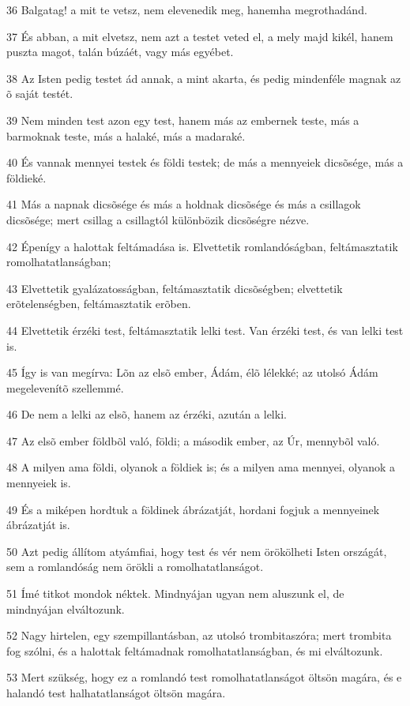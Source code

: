 \par 36 Balgatag! a mit te vetsz, nem elevenedik meg, hanemha megrothadánd.
\par 37 És abban, a mit elvetsz, nem azt a testet veted el, a mely majd kikél, hanem puszta magot, talán búzáét, vagy más egyébet.
\par 38 Az Isten pedig testet ád annak, a mint akarta, és pedig mindenféle magnak az õ saját testét.
\par 39 Nem minden test azon egy test, hanem más az embernek teste, más a barmoknak teste, más a halaké, más a madaraké.
\par 40 És vannak mennyei testek és földi testek; de más a mennyeiek dicsõsége, más a földieké.
\par 41 Más a napnak dicsõsége és más a holdnak dicsõsége és más a csillagok dicsõsége; mert csillag a csillagtól különbözik dicsõségre nézve.
\par 42 Épenígy a halottak feltámadása is. Elvettetik romlandóságban, feltámasztatik romolhatatlanságban;
\par 43 Elvettetik gyalázatosságban, feltámasztatik dicsõségben; elvettetik erõtelenségben, feltámasztatik erõben.
\par 44 Elvettetik érzéki test, feltámasztatik lelki test. Van érzéki test, és van lelki test is.
\par 45 Így is van megírva: Lõn az elsõ ember, Ádám, élõ lélekké; az utolsó Ádám megelevenítõ szellemmé.
\par 46 De nem a lelki az elsõ, hanem az érzéki, azután a lelki.
\par 47 Az elsõ ember földbõl való, földi; a második ember, az Úr, mennybõl való.
\par 48 A milyen ama földi, olyanok a földiek is; és a milyen ama mennyei, olyanok a mennyeiek is.
\par 49 És a miképen hordtuk a földinek ábrázatját, hordani fogjuk  a mennyeinek ábrázatját is.
\par 50 Azt pedig állítom atyámfiai, hogy test és vér nem örökölheti Isten országát, sem a romlandóság nem örökli a romolhatatlanságot.
\par 51 Ímé titkot mondok néktek. Mindnyájan ugyan nem aluszunk el, de mindnyájan elváltozunk.
\par 52 Nagy hirtelen, egy szempillantásban, az utolsó trombitaszóra; mert trombita fog szólni, és a halottak feltámadnak romolhatatlanságban, és mi elváltozunk.
\par 53 Mert szükség, hogy ez a romlandó test romolhatatlanságot öltsön magára, és e halandó test halhatatlanságot öltsön magára.
